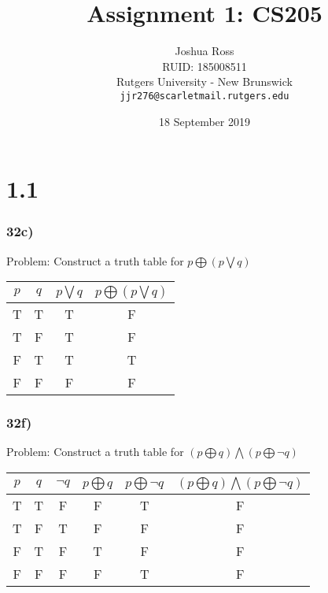 \documentclass{article}
\begin{document}
\title{Assignment 1: CS205}

\author{Joshua Ross\\
	RUID: 185008511\\
	Rutgers University - New Brunswick\\
	\texttt{jjr276@scarletmail.rutgers.edu}}

\date{18 September 2019}

\maketitle

\section*{1.1}
\subsubsection*{32c)}
Problem: Construct a truth table for $p \bigoplus (p \bigvee q)$
\begin{center}
\begin{tabular}{|c|c|c|c|}
\hline
$p$ & $q$ & $p \bigvee q$ & $p \bigoplus (p \bigvee q)$ \\
\hline
T & T & T & F \\
T & F & T & F \\
F & T & T & T \\
F & F & F & F \\
\hline
\end{tabular}
\end{center}
\subsubsection*{32f)}
Problem: Construct a truth table for $(p \bigoplus q) \bigwedge (p \bigoplus \neg q)$
\begin{center}
\begin{tabular}{|c|c|c|c|c|c|}
\hline
$p$ & $q$ & $\neg q$ & $p \bigoplus q$ & $p \bigoplus \neg q$ & $(p \bigoplus q) \bigwedge (p \bigoplus \neg q)$ \\
\hline
T & T & F & F & T & F\\
T & F & T & F & F & F\\
F & T & F & T & F & F\\
F & F & F & F & T & F\\
\hline
\end{tabular}
\end{center}
\end{document}
